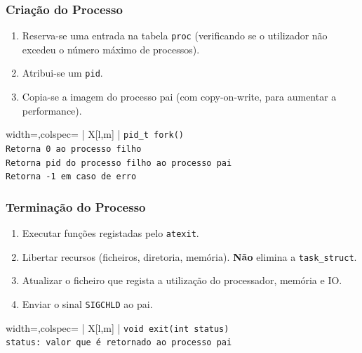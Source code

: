 \documentclass[11pt]{article}
\begin{document}
\subsubsection{Criação do Processo}

\begin{enumerate}[topsep=0pt,itemsep=0pt]
    \item Reserva-se uma entrada na tabela \lstinline|proc| (verificando se o utilizador não excedeu o número máximo de processos).
    \item Atribui-se um \lstinline|pid|.
    \item Copia-se a imagem do processo pai (com copy-on-write, para aumentar a performance).
\end{enumerate}

\begin{tblr}{width=\linewidth,colspec={ | X[l,m] | }}
    \hline
    \lstinline|pid_t fork()|                                  \\\hline
    \lstinline|Retorna 0 ao processo filho|                   \\
    \lstinline|Retorna pid do processo filho ao processo pai| \\
    \lstinline|Retorna -1 em caso de erro|                    \\\hline
\end{tblr}

\subsubsection{Terminação do Processo}

\begin{enumerate}[topsep=0pt,itemsep=0pt]
    \item Executar funções registadas pelo \lstinline|atexit|.
    \item Libertar recursos (ficheiros, diretoria, memória). \textbf{Não} elimina a \lstinline|task_struct|.
    \item Atualizar o ficheiro que regista a utilização do processador, memória e IO.
    \item Enviar o sinal \lstinline|SIGCHLD| ao pai.
\end{enumerate}

\begin{tblr}{width=\linewidth,colspec={ | X[l,m] | }}
    \hline
    \lstinline|void exit(int status)|                         \\\hline
    \lstinline|status: valor que é retornado ao processo pai| \\\hline
\end{tblr}
\end{document}
